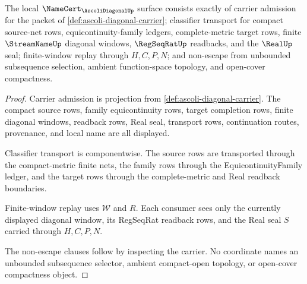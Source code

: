 \begin{theorem}
\label{thm:ascoli-diagonal-namecert-obligations}
The local $\NameCert_{\AscoliDiagonalUp}$ surface consists exactly of carrier
admission for the packet of \autoref{def:ascoli-diagonal-carrier}; classifier
transport for compact source-net rows, equicontinuity-family ledgers,
complete-metric target rows, finite $\StreamNameUp$ diagonal windows,
$\RegSeqRatUp$ readbacks, and the $\RealUp$ seal; finite-window replay through
$H,C,P,N$; and non-escape from unbounded subsequence selection, ambient
function-space topology, and open-cover compactness.
\end{theorem}
\begin{proof}
Carrier admission is projection from
\autoref{def:ascoli-diagonal-carrier}. The compact source rows, family
equicontinuity rows, target completion rows, finite diagonal windows, readback
rows, Real seal, transport rows, continuation routes, provenance, and local
name are all displayed.

Classifier transport is componentwise. The source rows are transported through
the compact-metric finite nets, the family rows through the
EquicontinuityFamily ledger, and the target rows through the complete-metric
and Real readback boundaries.

Finite-window replay uses $\mathcal{W}$ and $R$. Each consumer sees only the
currently displayed diagonal window, its RegSeqRat readback rows, and the Real
seal $S$ carried through $H,C,P,N$.

The non-escape clauses follow by inspecting the carrier. No coordinate names an
unbounded subsequence selector, ambient compact-open topology, or open-cover
compactness object.
\end{proof}

